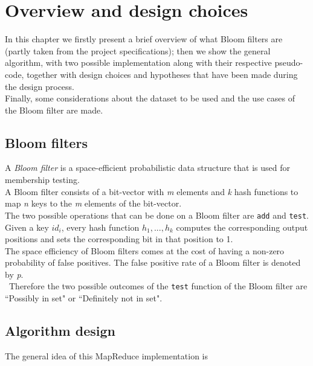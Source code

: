 %       
%
\chapter{Overview and design choices}\label{ch:design}
In this chapter we firstly present a brief overview of what Bloom filters are (partly taken from the project specifications); then we show the general algorithm, with two possible implementation along with their respective pseudo-code, together with design choices and hypotheses that have been made during the design process.\\
Finally, some considerations about the dataset to be used and the use cases of the Bloom filter are made.\\

\section{Bloom filters}
A \textit{Bloom filter} is a space-efficient probabilistic data structure that is used for membership testing.\\
A Bloom filter consists of a bit-vector with \textit{m} elements and \textit{k} hash functions to map \textit{n} keys to the \textit{m} elements of the bit-vector.\\
The two possible operations that can be done on a Bloom filter are \texttt{add} and \texttt{test}.\\
Given a key \textit{$id_{i}$}, every hash function \textit{$h_{1}, ..., h_{k}$} computes the corresponding output positions and sets the corresponding bit in that position to 1.\\
The space efficiency of Bloom filters comes at the cost of having a non-zero probability of false positives. The false positive rate of a Bloom filter is denoted by \textit{p}.\\\
Therefore the two possible outcomes of the \texttt{test} function of the Bloom filter are ``Possibly in set" or ``Definitely not in set".\\

\section{Algorithm design}
The general idea of this MapReduce implementation is


